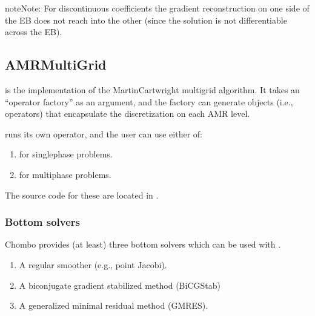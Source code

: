 \documentclass[letterpaper,10pt,english]{sphinxmanual}
\begin{document}
\begin{sphinxadmonition}{note}{Note:}
For discontinuous coefficients the gradient reconstruction on one side of the EB does not reach into the other (since the solution is not differentiable across the EB).
\end{sphinxadmonition}


\subsection{AMRMultiGrid}
\label{\detokenize{Source/LinearSolvers:amrmultigrid}}
 is the  implementation of the Martin\sphinxhyphen{}Cartwright multigrid algorithm.
It takes an “operator factory” as an argument, and the factory can generate objects (i.e., operators) that encapsulate the discretization on each AMR level.

 runs its own operator, and the user can use either of:
\begin{enumerate}
%
\item {} 
 for single\sphinxhyphen{}phase problems.

\item {} 
 for multi\sphinxhyphen{}phase problems.

\end{enumerate}

The source code for these are located in .


\subsubsection{Bottom solvers}
\label{\detokenize{Source/LinearSolvers:bottom-solvers}}
Chombo provides (at least) three bottom solvers which can be used with .
\begin{enumerate}
%
\item {} 
A regular smoother (e.g., point Jacobi).

\item {} 
A biconjugate gradient stabilized method (BiCGStab)

\item {} 
A generalized minimal residual method (GMRES).

\end{enumerate}
\end{document}
